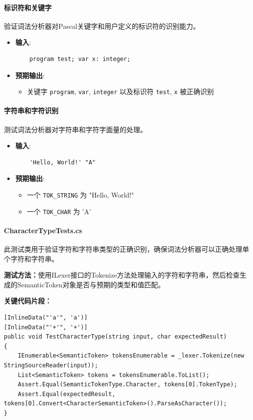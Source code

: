 \documentclass[../main.tex]{subfiles}
\begin{document}
\paragraph{标识符和关键字}
验证词法分析器对Pascal关键字和用户定义的标识符的识别能力。

\begin{itemize}
    \item \textbf{输入}:
    \begin{verbatim}
    program test; var x: integer;
    \end{verbatim}
    \item \textbf{预期输出}:
    \begin{itemize}
        \item 关键字 \texttt{program}, \texttt{var}, \texttt{integer} 以及标识符 \texttt{test}, \texttt{x} 被正确识别
    \end{itemize}
\end{itemize}

\paragraph{字符串和字符识别}
测试词法分析器对字符串和字符字面量的处理。

\begin{itemize}
    \item \textbf{输入}:
    \begin{verbatim}
    'Hello, World!' "A"
    \end{verbatim}
    \item \textbf{预期输出}:
    \begin{itemize}
        \item 一个 \texttt{TOK\_STRING} 为 "Hello, World!"
        \item 一个 \texttt{TOK\_CHAR} 为 'A'
    \end{itemize}
\end{itemize}

\paragraph{CharacterTypeTests.cs}
此测试类用于验证字符和字符串类型的正确识别，确保词法分析器可以正确处理单个字符和字符串。

\textbf{测试方法：}使用ILexer接口的Tokenize方法处理输入的字符和字符串，然后检查生成的SemanticToken对象是否与预期的类型和值匹配。

\textbf{关键代码片段：}
\begin{lstlisting}[style=csharp]
[InlineData("'a'", 'a')]
[InlineData("'+'", '+')]
public void TestCharacterType(string input, char expectedResult)
{
    IEnumerable<SemanticToken> tokensEnumerable = _lexer.Tokenize(new StringSourceReader(input));
    List<SemanticToken> tokens = tokensEnumerable.ToList();
    Assert.Equal(SemanticTokenType.Character, tokens[0].TokenType);
    Assert.Equal(expectedResult, tokens[0].Convert<CharacterSemanticToken>().ParseAsCharacter());
}
\end{lstlisting}
\end{document}
